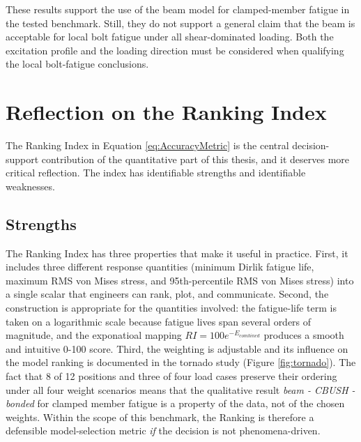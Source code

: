 \documentclass[a4paper,twoside]{bth}
\begin{document}
These results support the use of the beam model for clamped-member fatigue in the tested benchmark. Still, they do not support a general claim that the beam is acceptable for local bolt fatigue under all shear-dominated loading. Both the excitation profile and the loading direction must be considered when qualifying the local bolt-fatigue conclusions.

\newpage
\section{Reflection on the Ranking Index} \label{sec:RIreflection}

The Ranking Index in Equation \ref{eq:AccuracyMetric} is the central decision-support contribution of the quantitative part of this thesis, and it deserves more critical reflection. The index has identifiable strengths and identifiable weaknesses.

\subsection{Strengths}
The Ranking Index has three properties that make it useful in practice. First, it includes three different response quantities (minimum Dirlik fatigue life, maximum RMS von Mises stress, and 95th-percentile RMS von Mises stress) into a single scalar that engineers can rank, plot, and communicate. Second, the construction is appropriate for the quantities involved: the fatigue-life term is taken on a logarithmic scale because fatigue lives span several orders of magnitude, and the exponatioal mapping $RI = 100e^{-E_{combined}}$ produces a smooth and intuitive 0-100 score. Third, the weighting is adjustable and its influence on the model ranking is documented in the tornado study (Figure \ref{fig:tornado}). The fact that 8 of 12 positions and three of four load cases preserve their ordering under all four weight scenarios means that the qualitative result \textit{beam - CBUSH - bonded} for clamped member fatigue is a property of the data, not of the chosen weights. Within the scope of this benchmark, the Ranking is therefore a defensible model-selection metric \textit{if} the decision is not phenomena-driven.
\end{document}

